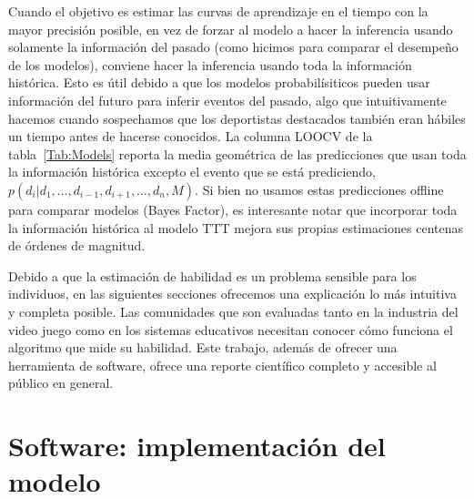 \documentclass[a4paper,11pt]{book}
\theoremstyle{definition}
\begin{document}
Cuando el objetivo es estimar las curvas de aprendizaje en el tiempo con la mayor precisi\'on posible, en vez de forzar al modelo a hacer la inferencia usando solamente la informaci\'on del pasado (como hicimos para comparar el desempe\~no de los modelos), conviene hacer la inferencia usando toda la informaci\'on hist\'orica.
%
Esto es \'util debido a que los modelos probabil\'isiticos pueden usar informaci\'on del futuro para inferir eventos del pasado, algo que intuitivamente hacemos cuando sospechamos que los deportistas destacados tambi\'en eran h\'abiles un tiempo antes de hacerse conocidos.
%
La columna LOOCV de la tabla~\ref{Tab:Models} reporta la media geom\'etrica de las predicciones que usan toda la informaci\'on hist\'orica excepto el evento que se est\'a prediciendo, $p(d_i| d_1, \dots, d_{i-1}, d_{i+1}, \dots, d_n , M)$.
%
Si bien no usamos estas predicciones offline para comparar modelos (Bayes Factor), es interesante notar que incorporar toda la informaci\'on hist\'orica al modelo TTT mejora sus propias estimaciones centenas de \'ordenes de magnitud.

Debido a que la estimaci\'on de habilidad es un problema sensible para los individuos, en las siguientes secciones ofrecemos una explicaci\'on lo m\'as intuitiva y completa posible.
%
Las comunidades que son evaluadas tanto en la industria del video juego como en los sistemas educativos necesitan conocer c\'omo funciona el algoritmo que mide su habilidad.
%
Este trabajo, adem\'as de ofrecer una herramienta de software, ofrece una reporte cient\'ifico completo y accesible al p\'ublico en general.




\section{Software: implementaci\'on del modelo}
\end{document}
